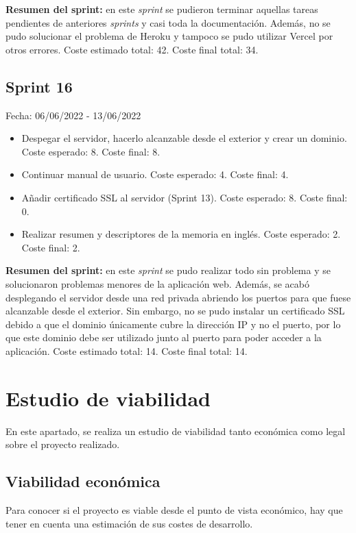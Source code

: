 \textbf{Resumen del sprint:} en este \textit{sprint} se pudieron terminar aquellas tareas pendientes de anteriores \textit{sprints} y casi toda la documentación. Además, no se pudo solucionar el problema de Heroku y tampoco se pudo utilizar Vercel por otros errores. Coste estimado total: 42. Coste final total: 34.

\subsection{Sprint 16}
Fecha: 06/06/2022 - 13/06/2022
\begin{itemize}
	\item Despegar el servidor, hacerlo alcanzable desde el exterior y crear un dominio. Coste esperado: 8. Coste final: 8.
	\item Continuar manual de usuario. Coste esperado: 4. Coste final: 4.
	\item Añadir certificado SSL al servidor (Sprint 13). Coste esperado: 8. Coste final: 0.
	\item Realizar resumen y descriptores de la memoria en inglés. Coste esperado: 2. Coste final: 2.
\end{itemize}

\textbf{Resumen del sprint:} en este \textit{sprint} se pudo realizar todo sin problema y se solucionaron problemas menores de la aplicación web. Además, se acabó desplegando el servidor desde una red privada abriendo los puertos para que fuese alcanzable desde el exterior. Sin embargo, no se pudo instalar un certificado SSL debido a que el dominio únicamente cubre la dirección IP y no el puerto, por lo que este dominio debe ser utilizado junto al puerto para poder acceder a la aplicación. Coste estimado total: 14. Coste final total: 14.

\section{Estudio de viabilidad}
En este apartado, se realiza un estudio de viabilidad tanto económica como legal sobre el proyecto realizado.

\subsection{Viabilidad económica}
Para conocer si el proyecto es viable desde el punto de vista económico, hay que tener en cuenta una estimación de sus costes de desarrollo.

